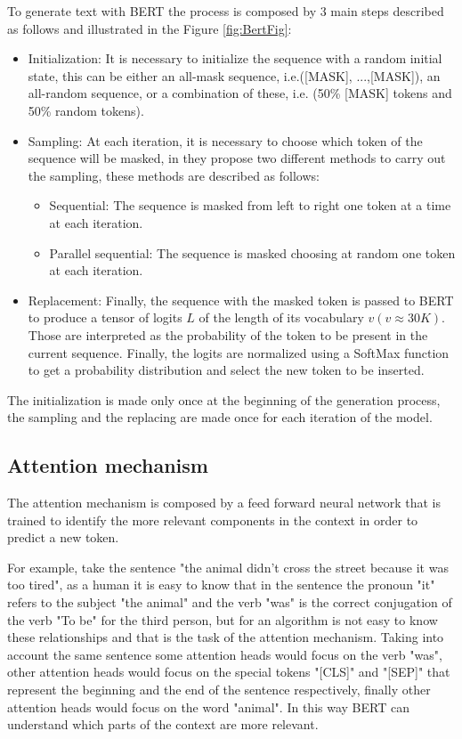 \documentclass[10pt,twocolumn,letterpaper]{article}
\begin{document}
To generate text with BERT the process is composed by 3 main steps described as follows and illustrated in the Figure \ref{fig:BertFig}:

\begin{itemize}
\item Initialization: It is necessary to initialize the sequence with a random initial state, this can be either an all-mask sequence,
i.e.([MASK], ...,[MASK]), an all-random sequence, or a combination of these, i.e. (50\% [MASK] tokens and 50\% random tokens).
\item Sampling: At each iteration, it is necessary to choose which token of the sequence will be masked, in \cite{wang2019bert}
they propose two different methods to carry out the sampling, these methods are described as follows:
\begin{itemize}
   \item Sequential: The sequence is masked from left to right one token at a time at each iteration.
   \item Parallel sequential: The sequence is masked choosing at random one token at each iteration.
\end{itemize}
\item Replacement: Finally, the sequence with the masked token is passed to BERT to produce a tensor of logits $L$ of
the length of its vocabulary $v (v \approx 30K)$. Those are interpreted as the probability of the token to be present in the current sequence.
Finally, the logits are normalized using a SoftMax function to get a probability distribution and select the new token to be inserted.
\end{itemize}

The initialization is made only once at the beginning of the generation process, the sampling and the replacing are
made once for each iteration of the model.

\subsection{Attention mechanism}
The attention mechanism is composed by a feed forward neural network that is trained to
identify the more relevant components in the context in order to predict a new token.

For example, take the sentence "the animal didn't cross the street because it was too tired",
as a human it is easy to know that in the sentence the pronoun "it" refers to the subject "the animal"
and the verb "was" is the correct conjugation of the verb "To be" for the third person, but for an
algorithm is not easy to know these relationships and that is the task of the attention mechanism.
Taking into account the same sentence
some attention heads would focus on the verb "was", other attention heads would focus
on the special tokens "[CLS]" and "[SEP]" that represent the beginning and the end of the sentence
respectively, finally other attention heads would focus on the word "animal". In this way BERT can
understand which parts of the context are more relevant.
\end{document}
